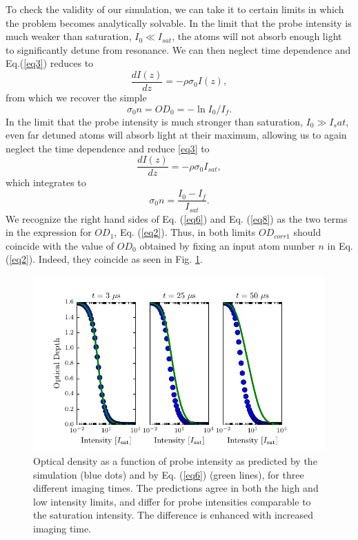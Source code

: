 \documentclass[12pt]{iopart}
\begin{document}
\par To check the validity of our simulation, we can take it to certain limits in which the problem becomes analytically solvable. In the limit that the probe intensity is much weaker than saturation, $I_0\ll I_{sat}$, the atoms will not absorb enough light to significantly detune from resonance. We can then neglect time dependence and Eq.(\ref{eq3}) reduces to 
\begin{equation}
\frac{dI(z)}{dz}=-\rho\sigma_0 I(z),
\end{equation}
from which we recover the simple
\begin{equation}
\sigma_0 n = OD_0 = -\ln I_0/I_f. \label{eq6}
\end{equation}
In the limit that the probe intensity is much stronger than saturation, $I_0\gg I_sat$, even far detuned atoms will absorb light at their maximum, allowing us to again neglect the time dependence and reduce \ref{eq3} to 
\begin{equation}
\frac{dI(z)}{dz}=-\rho\sigma_0 I_{sat}, 
\end{equation}
which integrates to 
\begin{equation}
\sigma_0 n = \frac{I_0 - I_f}{I_{sat}}. \label{eq8}
\end{equation}
We recognize the right hand sides of Eq. (\ref{eq6}) and Eq. (\ref{eq8}) as the two terms in the expression for $OD_1$, Eq. (\ref{eq2}). Thus, in both limits $OD_{corr1}$ should coincide with the value of $OD_0$ obtained by fixing an input atom number $n$ in Eq. (\ref{eq2}). Indeed, they coincide as seen in Fig. \ref{fig:IsatLimits}.
\begin{figure}
	\includegraphics{figure3.pdf}
\caption{Optical density as a function of probe intensity as predicted by the simulation (blue dots) and by Eq. (\ref{eq6}) (green lines), for three different imaging times. The predictions agree in both the high and low intensity limits, and differ for probe intensities comparable to the saturation intensity. The difference is enhanced with increased imaging time.}  
\label{fig:IsatLimits}
\end{figure}
\end{document}
